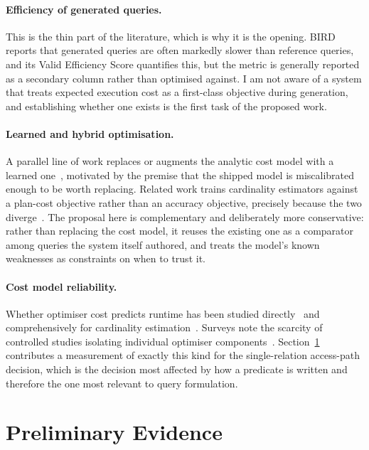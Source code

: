\documentclass[12pt, a4paper]{article}
\begin{document}
\paragraph{Efficiency of generated queries.}
This is the thin part of the literature, which is why it is the opening.
BIRD reports that generated queries are often markedly slower than
reference queries, and its Valid Efficiency Score quantifies this, but
the metric is generally reported as a secondary column rather than
optimised against. I am not aware of a system that treats expected
execution cost as a first-class objective during generation, and
establishing whether one exists is the first task of the proposed work.

\paragraph{Learned and hybrid optimisation.}
A parallel line of work replaces or augments the analytic cost model
with a learned one~\cite{marcus2019neo, marcus2021bao}, motivated by
the premise that the shipped model is miscalibrated enough to be worth
replacing. Related work trains cardinality estimators against a
plan-cost objective rather than an accuracy objective, precisely because
the two diverge~\cite{negi2021flow}. The proposal here is complementary
and deliberately more conservative: rather than replacing the cost
model, it reuses the existing one as a comparator among queries the
system itself authored, and treats the model's known weaknesses as
constraints on when to trust it.

\paragraph{Cost model reliability.}
Whether optimiser cost predicts runtime has been studied
directly~\cite{wu2013predicting} and comprehensively for cardinality
estimation~\cite{han2021cardinality}. Surveys note the scarcity of
controlled studies isolating individual optimiser
components~\cite{lan2021survey}. Section~\ref{sec:prelim} contributes a
measurement of exactly this kind for the single-relation access-path
decision, which is the decision most affected by how a predicate is
written and therefore the one most relevant to query formulation.

\section{Preliminary Evidence}
\label{sec:prelim}
\end{document}
